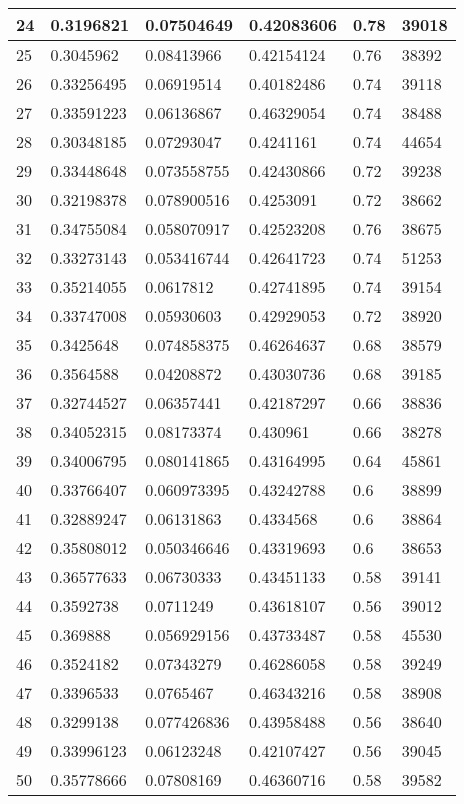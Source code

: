 \begin{longtable}{|l|l|l|l|l|l|}
24 & 0.3196821 & 0.07504649 & 0.42083606 & 0.78 & 39018 \\ \hline 
25 & 0.3045962 & 0.08413966 & 0.42154124 & 0.76 & 38392 \\ \hline 
26 & 0.33256495 & 0.06919514 & 0.40182486 & 0.74 & 39118 \\ \hline 
27 & 0.33591223 & 0.06136867 & 0.46329054 & 0.74 & 38488 \\ \hline 
28 & 0.30348185 & 0.07293047 & 0.4241161 & 0.74 & 44654 \\ \hline 
29 & 0.33448648 & 0.073558755 & 0.42430866 & 0.72 & 39238 \\ \hline 
30 & 0.32198378 & 0.078900516 & 0.4253091 & 0.72 & 38662 \\ \hline 
31 & 0.34755084 & 0.058070917 & 0.42523208 & 0.76 & 38675 \\ \hline 
32 & 0.33273143 & 0.053416744 & 0.42641723 & 0.74 & 51253 \\ \hline 
33 & 0.35214055 & 0.0617812 & 0.42741895 & 0.74 & 39154 \\ \hline 
34 & 0.33747008 & 0.05930603 & 0.42929053 & 0.72 & 38920 \\ \hline 
35 & 0.3425648 & 0.074858375 & 0.46264637 & 0.68 & 38579 \\ \hline 
36 & 0.3564588 & 0.04208872 & 0.43030736 & 0.68 & 39185 \\ \hline 
37 & 0.32744527 & 0.06357441 & 0.42187297 & 0.66 & 38836 \\ \hline 
38 & 0.34052315 & 0.08173374 & 0.430961 & 0.66 & 38278 \\ \hline 
39 & 0.34006795 & 0.080141865 & 0.43164995 & 0.64 & 45861 \\ \hline 
40 & 0.33766407 & 0.060973395 & 0.43242788 & 0.6 & 38899 \\ \hline 
41 & 0.32889247 & 0.06131863 & 0.4334568 & 0.6 & 38864 \\ \hline 
42 & 0.35808012 & 0.050346646 & 0.43319693 & 0.6 & 38653 \\ \hline 
43 & 0.36577633 & 0.06730333 & 0.43451133 & 0.58 & 39141 \\ \hline 
44 & 0.3592738 & 0.0711249 & 0.43618107 & 0.56 & 39012 \\ \hline 
45 & 0.369888 & 0.056929156 & 0.43733487 & 0.58 & 45530 \\ \hline 
46 & 0.3524182 & 0.07343279 & 0.46286058 & 0.58 & 39249 \\ \hline 
47 & 0.3396533 & 0.0765467 & 0.46343216 & 0.58 & 38908 \\ \hline 
48 & 0.3299138 & 0.077426836 & 0.43958488 & 0.56 & 38640 \\ \hline 
49 & 0.33996123 & 0.06123248 & 0.42107427 & 0.56 & 39045 \\ \hline 
50 & 0.35778666 & 0.07808169 & 0.46360716 & 0.58 & 39582 \\ \hline 
\end{longtable}